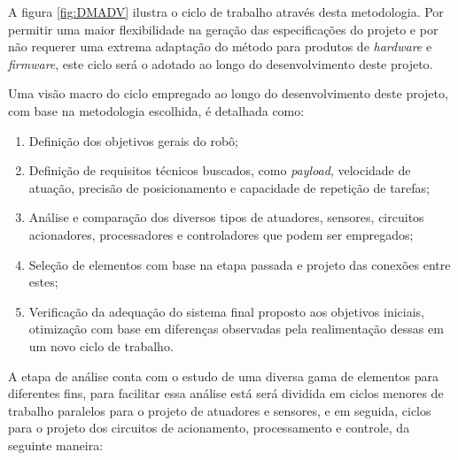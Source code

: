A figura \ref{fig:DMADV} ilustra o ciclo de trabalho através desta metodologia. Por permitir uma maior flexibilidade na geração das especificações do projeto e
por não requerer uma extrema adaptação do método para produtos de \textit{hardware} e \textit{firmware}, este ciclo será o adotado ao longo do desenvolvimento 
deste projeto. 

Uma visão macro do ciclo empregado ao longo do desenvolvimento deste projeto, com base na metodologia escolhida, é detalhada como:

\begin{enumerate}
    \item Definição dos objetivos gerais do robô;
    \item Definição de requisitos técnicos buscados, como \textit{payload}, velocidade de atuação, precisão de posicionamento e capacidade de repetição de tarefas;
    \item Análise e comparação dos diversos tipos de atuadores, sensores, circuitos acionadores, processadores e controladores que podem ser empregados;
    \item Seleção de elementos com base na etapa passada e projeto das conexões entre estes;
    \item Verificação da adequação do sistema final proposto aos objetivos iniciais, otimização com base em diferenças observadas pela realimentação dessas em um novo ciclo de trabalho.
\end{enumerate}

A etapa de análise conta com o estudo de uma diversa gama de elementos para diferentes fins, para facilitar essa análise está será dividida em ciclos menores de 
trabalho paralelos para o projeto de atuadores e sensores, e em seguida, ciclos para o projeto dos circuitos de acionamento, processamento e controle, da seguinte
maneira:

